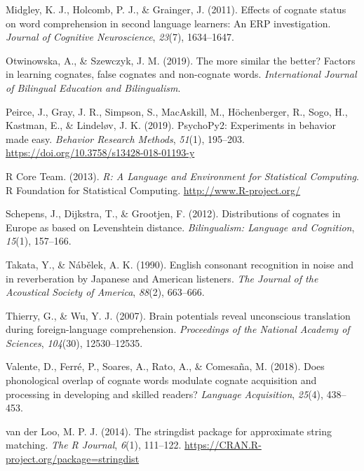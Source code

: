 \documentclass[
]{article}
\newlength{\cslhangindent}
\newenvironment{CSLReferences}[2] %
 {\begin{list}{}{%
  \setlength{\itemindent}{0pt}
  \setlength{\leftmargin}{0pt}
  \setlength{\parsep}{0pt}
  \ifodd #1
   \setlength{\leftmargin}{\cslhangindent}
   \setlength{\itemindent}{-1\cslhangindent}
  \fi
  \setlength{\itemsep}{#2\baselineskip}}}
 {\end{list}}
\begin{document}
\begin{CSLReferences}{1}{0}
Midgley, K. J., Holcomb, P. J., \& Grainger, J. (2011). Effects of
cognate status on word comprehension in second language learners: {An
ERP} investigation. \emph{Journal of Cognitive Neuroscience},
\emph{23}(7), 1634--1647.

Otwinowska, A., \& Szewczyk, J. M. (2019). The more similar the better?
Factors in learning cognates, false cognates and non-cognate words.
\emph{International Journal of Bilingual Education and Bilingualism}.

Peirce, J., Gray, J. R., Simpson, S., MacAskill, M., Höchenberger, R.,
Sogo, H., Kastman, E., \& Lindeløv, J. K. (2019). {PsychoPy2}:
{Experiments} in behavior made easy. \emph{Behavior Research Methods},
\emph{51}(1), 195--203. \url{https://doi.org/10.3758/s13428-018-01193-y}

R Core Team. (2013). \emph{R: {A Language} and {Environment} for
{Statistical Computing}}. R Foundation for Statistical Computing.
\url{http://www.R-project.org/}

Schepens, J., Dijkstra, T., \& Grootjen, F. (2012). Distributions of
cognates in {Europe} as based on {Levenshtein} distance.
\emph{Bilingualism: Language and Cognition}, \emph{15}(1), 157--166.

Takata, Y., \& Nábělek, A. K. (1990). English consonant recognition in
noise and in reverberation by {Japanese} and {American} listeners.
\emph{The Journal of the Acoustical Society of America}, \emph{88}(2),
663--666.

Thierry, G., \& Wu, Y. J. (2007). Brain potentials reveal unconscious
translation during foreign-language comprehension. \emph{Proceedings of
the National Academy of Sciences}, \emph{104}(30), 12530--12535.

Valente, D., Ferré, P., Soares, A., Rato, A., \& Comesaña, M. (2018).
Does phonological overlap of cognate words modulate cognate acquisition
and processing in developing and skilled readers? \emph{Language
Acquisition}, \emph{25}(4), 438--453.

van der Loo, M. P. J. (2014). The stringdist package for approximate
string matching. \emph{The R Journal}, \emph{6}(1), 111--122.
\url{https://CRAN.R-project.org/package=stringdist}


\end{CSLReferences}
\end{document}
